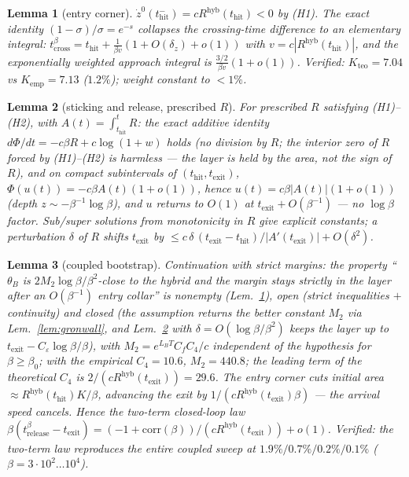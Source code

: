 \documentclass[11pt]{article}
\newtheorem{lemma}{Lemma}
\newcommand{\thit}{t_{\mathrm{hit}}}
\newcommand{\texit}{t_{\mathrm{exit}}}
\begin{document}
\begin{lemma}[entry corner]\label{lem:corner-in}
$\dot z^0(\thit^-)=cR^{\mathrm{hyb}}(\thit)<0$ by (H1). The exact identity
$(1-\sigma)/\sigma=e^{-s}$ collapses the crossing-time difference to an elementary
integral: $t_{\mathrm{cross}}^\beta=\thit+\tfrac{1}{\beta v}(1+O(\delta_z)+o(1))$
with $v=c|R^{\mathrm{hyb}}(\thit)|$, and the exponentially weighted approach
integral is $\tfrac{3/2}{\beta v}(1+o(1))$. Verified: $K_{\mathrm{teo}}=7.04$ vs
$K_{\mathrm{emp}}=7.13$ ($1.2\%$); weight constant to $<1\%$.
\end{lemma}

\begin{lemma}[sticking and release, prescribed $R$]\label{lem:release}
For prescribed $R$ satisfying (H1)--(H2), with $A(t)=\int_{\thit}^t R$: the exact
additive identity $d\Phi/dt=-c\beta R+c\log(1+w)$ holds (no division by $R$; the
interior zero of $R$ forced by (H1)--(H2) is harmless --- the layer is held by
the \emph{area}, not the sign of $R$), and on compact subintervals of
$(\thit,\texit)$, $\Phi(u(t))=-c\beta A(t)(1+o(1))$, hence
$u(t)=c\beta|A(t)|(1+o(1))$ (depth $z\sim-\beta^{-1}\log\beta$), and $u$ returns
to $O(1)$ at $\texit+O(\beta^{-1})$ --- no $\log\beta$ factor. Sub/super solutions
from monotonicity in $R$ give explicit constants; a perturbation $\delta$ of $R$
shifts $\texit$ by $\le c\,\delta\,(\texit-\thit)/|A'(\texit)|+O(\delta^2)$.
\end{lemma}

\begin{lemma}[coupled bootstrap]\label{lem:bootstrap}
Continuation with strict margins: the property ``$\theta_B$ is
$2M_2\log\beta/\beta^2$-close to the hybrid and the margin stays strictly in the
layer after an $O(\beta^{-1})$ entry collar'' is nonempty
(Lem.~\ref{lem:corner-in}), open (strict inequalities $+$ continuity) and closed
(the assumption returns the better constant $M_2$ via Lem.~\ref{lem:gronwall},
and Lem.~\ref{lem:release} with $\delta=O(\log\beta/\beta^2)$ keeps the layer up
to $\texit-C_\varepsilon\log\beta/\beta$), with $M_2=e^{L_BT}C_fC_4/c$ independent
of the hypothesis for $\beta\ge\beta_0$; with the empirical $C_4=10.6$,
$M_2=440.8$; the leading term of the theoretical $C_4$ is
$2/(cR^{\mathrm{hyb}}(\texit))=29.6$. The entry corner cuts initial area
$\approx R^{\mathrm{hyb}}(\thit)K/\beta$, advancing the exit by
$1/(cR^{\mathrm{hyb}}(\texit)\beta)$ --- the arrival speed cancels. Hence the
two-term closed-loop law
$\beta(t^\beta_{\mathrm{release}}-\texit)=(-1+\mathrm{corr}(\beta))/(cR^{\mathrm{hyb}}(\texit))+o(1)$.
Verified: the two-term law reproduces the entire coupled sweep at
$1.9\%/0.7\%/0.2\%/0.1\%$ ($\beta=3\cdot10^2\ldots10^4$).
\end{lemma}
\end{document}
